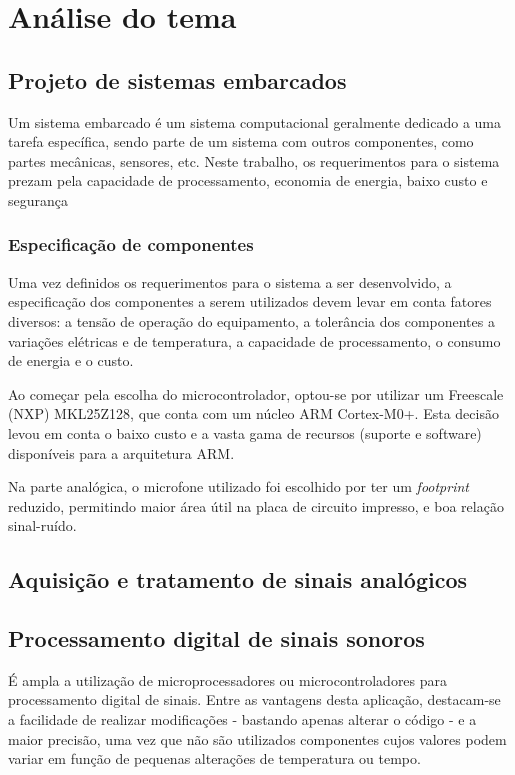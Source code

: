 \documentclass[a4paper, 12pt]{article}
\begin{document}
		\newpage
	\section{Análise do tema}
		\subsection{Projeto de sistemas embarcados}
		Um sistema embarcado é um sistema computacional geralmente dedicado a uma tarefa específica, sendo parte de um sistema com outros componentes, como partes mecânicas, sensores, etc.
		Neste trabalho, os requerimentos para o sistema prezam pela capacidade de processamento, economia de energia, baixo custo e segurança
		\subsubsection{Especificação de componentes}
		Uma vez definidos os requerimentos para o sistema a ser desenvolvido, a especificação dos componentes a serem utilizados devem levar em conta fatores diversos: a tensão de operação do equipamento, a tolerância dos componentes a variações elétricas e de temperatura, a capacidade de processamento, o consumo de energia e o custo.
		
		Ao começar pela escolha do microcontrolador, optou-se por utilizar um Freescale (NXP) MKL25Z128, que conta com um núcleo ARM Cortex-M0+. Esta decisão levou em conta o baixo custo e a vasta gama de recursos (suporte e software) disponíveis para a arquitetura ARM.
		
		Na parte analógica, o microfone %
		utilizado foi escolhido por ter um \textit{footprint} reduzido, permitindo maior área útil na placa de circuito impresso, e boa relação sinal-ruído.
		
		\subsection{Aquisição e tratamento de sinais analógicos}
		
			
		\subsection{Processamento digital de sinais sonoros}
		É ampla a utilização de microprocessadores ou microcontroladores para processamento digital de sinais. Entre as vantagens desta aplicação, destacam-se a facilidade de realizar modificações - bastando apenas alterar o código - e a maior precisão, uma vez que não são utilizados componentes cujos valores podem variar em função de pequenas alterações de temperatura ou tempo. \cite{dsp_vantagens}
\end{document}
